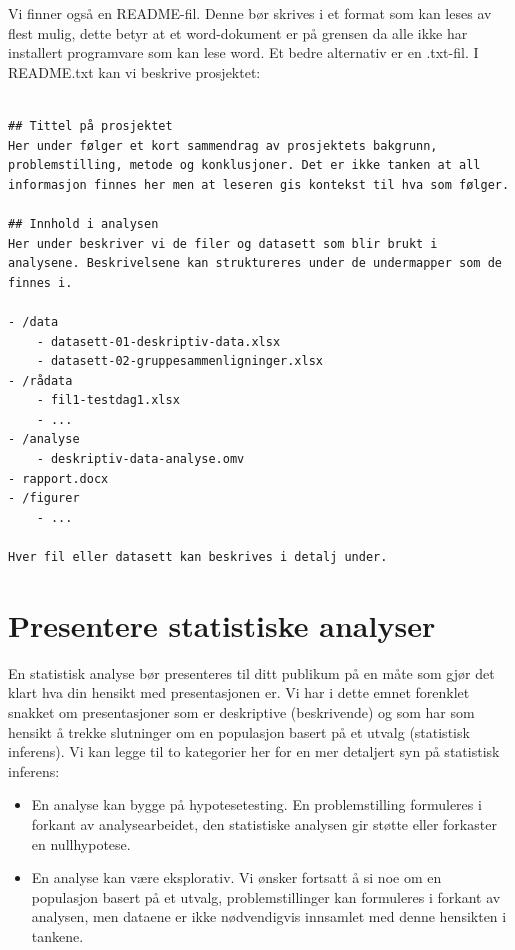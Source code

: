 \documentclass[
  letterpaper,
  DIV=11,
  numbers=noendperiod,
  oneside]{scrreprt}
\providecommand{\tightlist}{%
  \setlength{\itemsep}{0pt}\setlength{\parskip}{0pt}}\usepackage{longtable,booktabs,array}
\begin{document}
Vi finner også en README-fil. Denne bør skrives i et format som kan
leses av flest mulig, dette betyr at et word-dokument er på grensen da
alle ikke har installert programvare som kan lese word. Et bedre
alternativ er en .txt-fil. I README.txt kan vi beskrive prosjektet:

\begin{verbatim}

## Tittel på prosjektet
Her under følger et kort sammendrag av prosjektets bakgrunn, problemstilling, metode og konklusjoner. Det er ikke tanken at all informasjon finnes her men at leseren gis kontekst til hva som følger.

## Innhold i analysen
Her under beskriver vi de filer og datasett som blir brukt i analysene. Beskrivelsene kan struktureres under de undermapper som de finnes i.

- /data
    - datasett-01-deskriptiv-data.xlsx
    - datasett-02-gruppesammenligninger.xlsx
- /rådata
    - fil1-testdag1.xlsx
    - ...
- /analyse
    - deskriptiv-data-analyse.omv
- rapport.docx
- /figurer
    - ...

Hver fil eller datasett kan beskrives i detalj under.

\end{verbatim}

\hypertarget{presentere-statistiske-analyser}{%
\section{Presentere statistiske
analyser}\label{presentere-statistiske-analyser}}

En statistisk analyse bør presenteres til ditt publikum på en måte som
gjør det klart hva din hensikt med presentasjonen er. Vi har i dette
emnet forenklet snakket om presentasjoner som er deskriptive
(beskrivende) og som har som hensikt å trekke slutninger om en
populasjon basert på et utvalg (statistisk inferens). Vi kan legge til
to kategorier her for en mer detaljert syn på statistisk inferens:

\begin{itemize}
\tightlist
\item
  En analyse kan bygge på hypotesetesting. En problemstilling formuleres
  i forkant av analysearbeidet, den statistiske analysen gir støtte
  eller forkaster en nullhypotese.
\item
  En analyse kan være eksplorativ. Vi ønsker fortsatt å si noe om en
  populasjon basert på et utvalg, problemstillinger kan formuleres i
  forkant av analysen, men dataene er ikke nødvendigvis innsamlet med
  denne hensikten i tankene.
\end{itemize}
\end{document}
